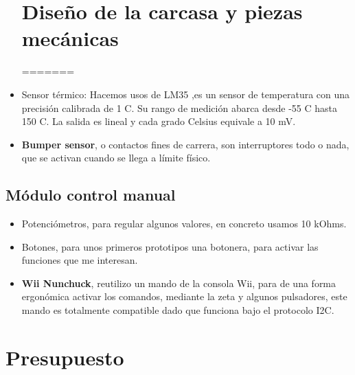 \begin{itemize}
\begin{itemize}
\end{itemize}









\section{Diseño de la carcasa y piezas mecánicas}
=======
	\item Sensor térmico: Hacemos usos de  LM35 \cite{LM35},es un sensor de temperatura con una precisión calibrada de 1 \grad C. Su rango de medición abarca desde -55 \grad C hasta 150 \grad C. La salida es lineal y cada grado Celsius equivale a 10 mV.
	\item \textbf{Bumper sensor}, o contactos fines de carrera, son interruptores todo o nada, que se activan cuando se llega a límite físico. 
\end{itemize}


\subsection{Módulo control manual}

\begin{itemize}
	\item Potenciómetros, para regular algunos valores, en concreto usamos 10 kOhms.
	
	\item Botones, para unos primeros prototipos una botonera, para activar las funciones que me interesan.
	
	\item \textbf{Wii Nunchuck}, reutilizo un mando de la consola Wii, para de una forma ergonómica activar los comandos, mediante la zeta y algunos pulsadores, este mando es totalmente compatible dado que funciona bajo el protocolo I2C.
	 
\end{itemize}

\section{Presupuesto}

